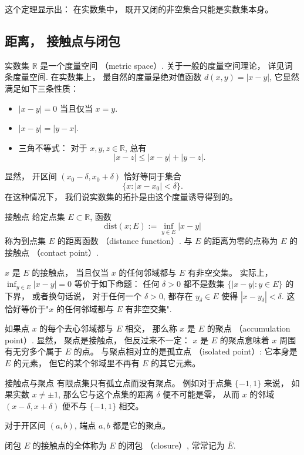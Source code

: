 这个定理显示出： 在实数集中， 既开又闭的非空集合只能是实数集本身。

\subsection{距离， 接触点与闭包}
实数集 $\mathbb{R}$ 是一个度量空间 （metric space）. 关于一般的度量空间理论， 详见词条度量空间. 在实数集上， 最自然的度量是绝对值函数 $d(x,y)=|x-y|$, 它显然满足如下三条性质：

\begin{itemize}
\item $|x-y|=0$ 当且仅当 $x=y$.
\item $|x-y|=|y-x|$.
\item 三角不等式： 对于 $x,y,z\in\mathbb{R}$, 总有
$$
|x-z|\leq|x-y|+|y-z|.
$$
\end{itemize}

显然， 开区间 $(x_0-\delta,x_0+\delta)$ 恰好等同于集合
$$
\{x:|x-x_0|<\delta\}.
$$
在这种情况下， 我们说实数集的拓扑是由这个度量诱导得到的。

\begin{definition}{接触点}
给定点集 $E\subset\mathbb{R}$, 函数
$$
\text{dist}(x;E):=\inf_{y\in E}|x-y|
$$
称为到点集 $E$ 的距离函数 （distance function）. 与 $E$ 的距离为零的点称为 $E$ 的接触点 （contact point）. 
\end{definition}
$x$ 是 $E$ 的接触点， 当且仅当 $x$ 的任何邻域都与 $E$ 有非空交集。 实际上， $\inf_{y\in E}|x-y|=0$ 等价于如下命题： 任何 $\delta>0$ 都不是数集 $\{|x-y|:y\in E\}$ 的下界， 或者换句话说， 对于任何一个 $\delta>0$, 都存在 $y_\delta\in E$ 使得 $|x-y_\delta|<\delta$. 这恰好等价于"$x$ 的任何邻域都与 $E$ 有非空交集".

如果点 $x$ 的每个去心邻域都与 $E$ 相交， 那么称 $x$ 是 $E$ 的聚点 （accumulation point）. 显然， 聚点是接触点， 但反过来不一定： $x$ 是 $E$ 的聚点意味着 $x$ 周围有无穷多个属于 $E$ 的点。 与聚点相对立的是孤立点 （isolated point）: 它本身是 $E$ 的元素， 但它的某个邻域里不再有 $E$ 的其它元素。

\begin{example}{接触点与聚点}
有限点集只有孤立点而没有聚点。 例如对于点集 $\{-1,1\}$ 来说， 如果实数 $x\neq\pm1$, 那么它与这个点集的距离 $\delta$ 便不可能是零， 从而 $x$ 的邻域 $(x-\delta,x+\delta)$ 便不与 $\{-1,1\}$ 相交。

对于开区间 $(a,b)$, 端点 $a,b$ 都是它的聚点。
\end{example}

\begin{definition}{闭包}
$E$ 的接触点的全体称为 $E$ 的闭包 （closure）, 常常记为 $\bar E$.
\end{definition}

